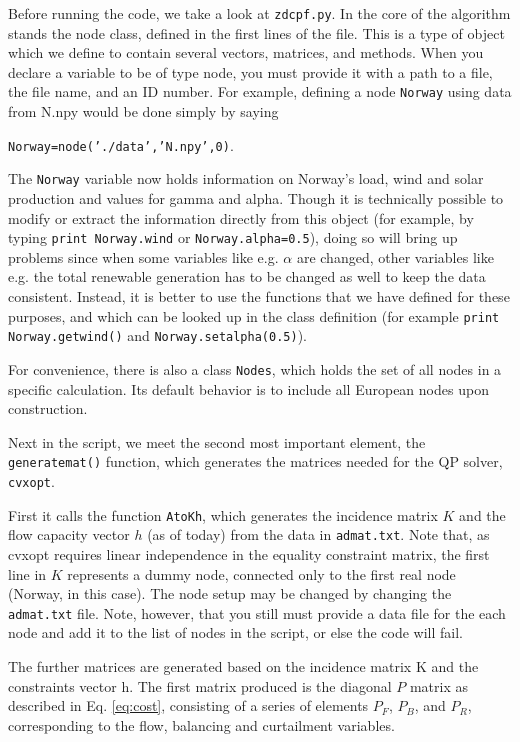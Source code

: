 \documentclass[english,twoside,a4paper,11pt]{article}
\numberwithin{equation}{section}
\begin{document}
Before running the code, we take a look at \texttt{zdcpf.py}. In the
core of the algorithm stands the node class, defined in the first
lines of the file. This is a type of object which we define
to contain several vectors, matrices, and methods. When you declare a
variable to be of type node, you must provide it with a path to a
file, the file name, and an ID number. For example, defining a node
\texttt{Norway} using data from N.npy would be done simply by saying

\noindent
\texttt{Norway=node('./data','N.npy',0)}. 

The \texttt{Norway} variable now holds
information on Norway's load, wind and solar production and values for
gamma and alpha. Though it is technically possible to modify or
extract the information directly from this object (for example, by
typing \texttt{print Norway.wind} or \texttt{Norway.alpha=0.5}), doing so will
bring up problems since when some variables like e.g. $\alpha$ are
changed, other variables like e.g. the total renewable generation has
to be changed as well to keep the 
data consistent. Instead, it is better to use the
functions that we have defined for these purposes, and which can be
looked up in the class definition (for example \texttt{print
  Norway.getwind()} and \texttt{Norway.setalpha(0.5)}).

For convenience, there is also a class \texttt{Nodes}, which holds the
set of all nodes in a specific calculation. Its default behavior is to
include all European nodes upon construction.

Next in the script, we meet the second most important element, the
\texttt{generatemat()} function, which generates the
matrices needed for the QP solver, \texttt{cvxopt}. 

First it calls the function \texttt{AtoKh}, which generates the
incidence matrix $K$ and the 
flow capacity vector $h$ (as of today) from the data in
\texttt{admat.txt}. Note that, as cvxopt requires linear independence
in the equality constraint matrix, the first line in $K$ represents a
dummy node, connected only to the first real node (Norway, in this
case). The node setup may be changed by changing the
\texttt{admat.txt} file. Note, however, that you still must provide a
data file for the each node and add it to the list of nodes in the
script, or else the code will fail.

The further matrices are generated based on the incidence matrix K and
the constraints vector h. The first matrix produced
is the diagonal $P$ matrix as described in Eq. \eqref{eq:cost},
consisting of a series of elements $P_F$, $P_B$, and $P_R$,
corresponding to the flow, balancing and curtailment variables. 
\end{document}
